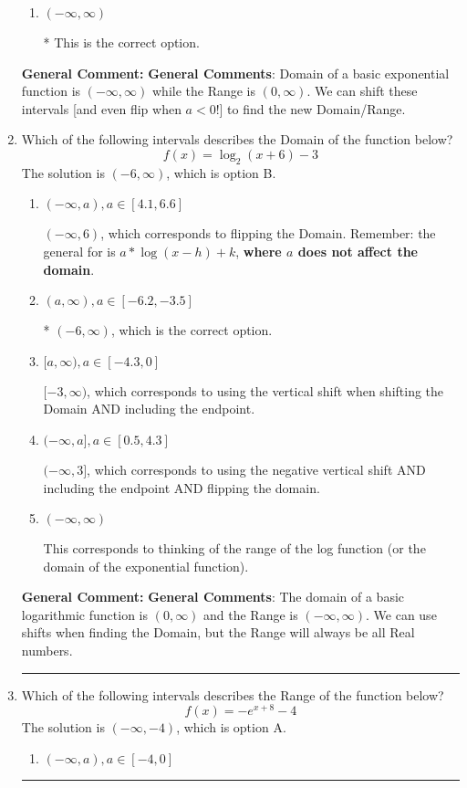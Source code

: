 \documentclass{extbook}[14pt]
\newcommand{\litem}[1]{\item #1

\rule{\textwidth}{0.4pt}}
\begin{document}
\begin{enumerate}
{\begin{enumerate}[label=\Alph*.]
$(-\infty, 5)$, which corresponds to using the correct vertical shift *if we wanted the Range*.
\item \( (-\infty, \infty) \)

* This is the correct option.
\end{enumerate}

\textbf{General Comment:} \textbf{General Comments}: Domain of a basic exponential function is $(-\infty, \infty)$ while the Range is $(0, \infty)$. We can shift these intervals [and even flip when $a<0$!] to find the new Domain/Range.
}
\litem{
Which of the following intervals describes the Domain of the function below?
\[ f(x) = \log_2{(x+6)}-3 \]The solution is \( (-6, \infty) \), which is option B.\begin{enumerate}[label=\Alph*.]
\item \( (-\infty, a), a \in [4.1, 6.6] \)

$(-\infty, 6)$, which corresponds to flipping the Domain. Remember: the general for is $a*\log(x-h)+k$, \textbf{where $a$ does not affect the domain}.
\item \( (a, \infty), a \in [-6.2, -3.5] \)

* $(-6, \infty)$, which is the correct option.
\item \( [a, \infty), a \in [-4.3, 0] \)

$[-3, \infty)$, which corresponds to using the vertical shift when shifting the Domain AND including the endpoint.
\item \( (-\infty, a], a \in [0.5, 4.3] \)

$(-\infty, 3]$, which corresponds to using the negative vertical shift AND including the endpoint AND flipping the domain.
\item \( (-\infty, \infty) \)

This corresponds to thinking of the range of the log function (or the domain of the exponential function).
\end{enumerate}

\textbf{General Comment:} \textbf{General Comments}: The domain of a basic logarithmic function is $(0, \infty)$ and the Range is $(-\infty, \infty)$. We can use shifts when finding the Domain, but the Range will always be all Real numbers.
}
\litem{
Which of the following intervals describes the Range of the function below?
\[ f(x) = -e^{x+8}-4 \]The solution is \( (-\infty, -4) \), which is option A.\begin{enumerate}[label=\Alph*.]
\item \( (-\infty, a), a \in [-4, 0] \)


\end{enumerate}}
\end{enumerate}
\end{document}
